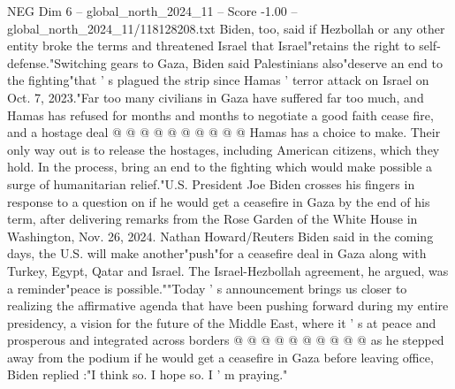 \begin{textsample}{NEG Dim 6 – global\_north\_2024\_11 – Score -1.00 – global\_north\_2024\_11/118128208.txt}
Biden, too, said if Hezbollah or any other entity broke the terms and threatened Israel that Israel"retains the right to self-defense."Switching gears to Gaza, Biden said Palestinians also"deserve an end to the fighting"that ' s plagued the strip since Hamas ' terror attack on Israel on Oct. 7, 2023."Far too many civilians in Gaza have suffered far too much, and Hamas has refused for months and months to negotiate a good faith cease fire, and a hostage deal @ @ @ @ @ @ @ @ @ @ Hamas has a choice to make.
Their only way out is to release the hostages, including American citizens, which they hold.
In the process, bring an end to the fighting which would make possible a surge of humanitarian relief."U.S.
President Joe Biden crosses his fingers in response to a question on if he would get a ceasefire in Gaza by the end of his term, after delivering remarks from the Rose Garden of the White House in Washington, Nov. 26, 2024.
Nathan Howard/Reuters Biden said in the coming days, the U.S. will make another"push"for a ceasefire deal in Gaza along with Turkey, Egypt, Qatar and Israel.
The Israel-Hezbollah agreement, he argued, was a reminder"peace is possible.""Today ' s announcement brings us closer to realizing the affirmative agenda that have been pushing forward during my entire presidency, a vision for the future of the Middle East, where it ' s at peace and prosperous and integrated across borders @ @ @ @ @ @ @ @ @ @ as he stepped away from the podium if he would get a ceasefire in Gaza before leaving office, Biden replied :"I think so.
I hope so.
I ' m praying."

\end{textsample}
